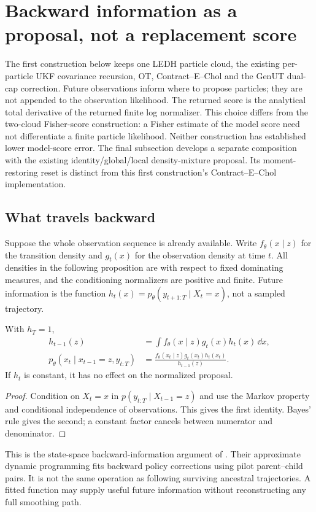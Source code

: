 \section{Backward information as a proposal, not a replacement score}
\label{sec:backward-guidance}

The first construction below keeps one LEDH particle cloud, the existing
per-particle UKF covariance recursion, OT, Contract--E--Chol and the GenUT
dual-cap correction. Future observations inform where to propose particles;
they are not appended to the observation likelihood. The returned score is
the analytical total derivative of the returned finite log normalizer. This
choice differs from the two-cloud Fisher-score construction: a Fisher
estimate of the model score need not differentiate a finite particle
likelihood. Neither construction has established lower model-score error.
The final subsection develops a separate composition with the existing
identity/global/local density-mixture proposal. Its moment-restoring reset is
distinct from this first construction's Contract--E--Chol implementation.

\subsection{What travels backward}

Suppose the whole observation sequence is already available. Write
$f_\theta(x\mid z)$ for the transition density and $g_t(x)$ for the
observation density at time $t$. All densities in the following proposition
are with respect to fixed dominating measures, and the conditioning
normalizers are positive and finite. Future information is the function
$h_t(x)=p_\theta(y_{t+1:T}\mid X_t=x)$, not a sampled trajectory.

\begin{proposition}
\label{prop:bg-backward}
With $h_T=1$,
\begin{align}
 h_{t-1}(z)&=\int f_\theta(x\mid z)g_t(x)h_t(x)\,\dd x,
 \label{eq:bg-backward}\\
 p_\theta(x_t\mid x_{t-1}=z,y_{t:T})
 &=\frac{f_\theta(x_t\mid z)g_t(x_t)h_t(x_t)}{h_{t-1}(z)}.
 \label{eq:bg-smoothing-proposal}
\end{align}
If $h_t$ is constant, it has no effect on the normalized proposal.
\end{proposition}
\begin{proof}
Condition on $X_t=x$ in $p(y_{t:T}\mid X_{t-1}=z)$ and use the Markov
property and conditional independence of observations. This gives the first
identity. Bayes' rule gives the second; a constant factor cancels between
numerator and denominator.
\end{proof}
This is the state-space backward-information argument of
\citet[eqs.~(9)--(10), Proposition~4.1]{heng2020controlled}. Their approximate
dynamic programming fits backward policy corrections using pilot
parent--child pairs. It is not the same operation as following surviving
ancestral trajectories. A fitted function may supply useful future
information without reconstructing any full smoothing path.

